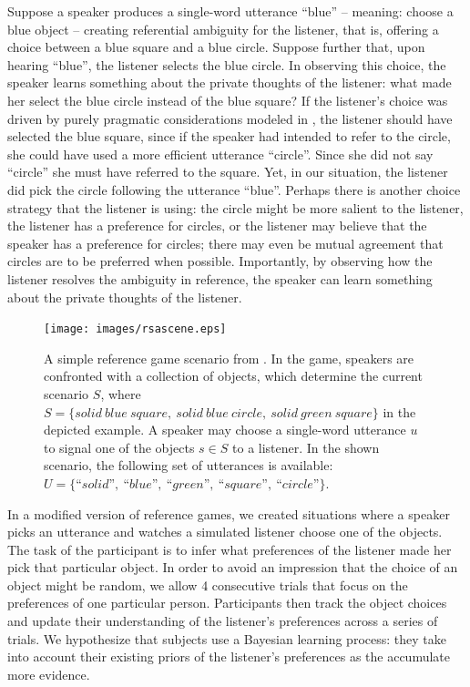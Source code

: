 \documentclass[10pt,a4paper]{article}
\begin{document}
Suppose a speaker produces a single-word utterance ``blue'' -- meaning: choose a blue object -- creating referential ambiguity for the listener, that is, offering a choice between a blue square and a blue circle. 
Suppose further that, upon hearing ``blue'', the listener selects the blue circle.
In observing this choice, the speaker learns something about the private thoughts of the listener: what made her select the blue circle instead of the blue square? If the listener's choice was driven by purely pragmatic considerations modeled in , the listener should have selected the blue square, since if the speaker had intended to refer to the circle, she could have used a more efficient utterance ``circle''. Since she did not say ``circle'' she must have referred to the square. Yet, in our situation, the listener did pick the circle following the utterance ``blue''. Perhaps there is another choice strategy that the listener is using: the circle might be more salient to the listener, the listener has a preference for circles, or the listener may believe that the speaker has a preference for circles; there may even be mutual agreement that circles are to be preferred when possible. Importantly, by observing how the listener resolves the ambiguity in reference, the speaker can learn something about the private thoughts of the listener.

\begin{figure}
	\centering
	\texttt{[image: images/rsascene.eps]}
	\caption{A simple reference game scenario from \protect{}.
		In the game, speakers are confronted with a collection of objects, which determine the current scenario $S$, where $S=\{solid\ blue\ square,\ solid\ blue\ circle,\ solid\ green\ square\}$ in the depicted example. 
		A speaker may choose a single-word utterance $u$ to signal one of the objects $s\in S$ to a listener.
		In the shown scenario, the following set of utterances is available: $U =\{\textit{``solid''},\ \textit{``blue''},\ \textit{``green''},\ \textit{``square''},\ \textit{``circle''}\}$.
	}
	\label{FG-ref-game}
\end{figure}


In a modified version of reference games, we created situations where a speaker picks an utterance and watches a simulated listener choose one of the objects. The task of the participant is to infer what preferences of the listener made her pick that particular object. In order to avoid an impression that the choice of an object might be random, we allow 4 consecutive trials that focus on the preferences of one particular person. Participants then track the object choices and update their understanding of the listener's preferences across a series of trials. 
We hypothesize that subjects use a Bayesian learning process: they take into account their existing priors of the listener's preferences as the accumulate more evidence.
\end{document}

